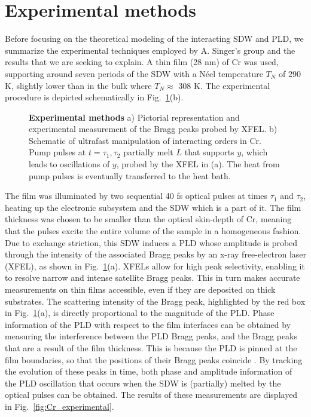 \section{Experimental methods}
Before focusing on the theoretical modeling of the interacting SDW and PLD, we summarize the experimental techniques employed by A. Singer's group and the results that we are seeking to explain.
A thin film (28 nm) of Cr was used, supporting around seven periods of the SDW with a N\'eel temperature $T_N$ of 290 K, slightly lower than in the bulk where $T_N\approx$ 308 K.
The experimental procedure is depicted schematically in Fig.~\ref{fig:Cr_schematic}(b). 
\begin{figure}[h]
\caption{\label{fig:Cr_schematic}{\bf Experimental methods} a) Pictorial representation and experimental measurement of the Bragg peaks probed by XFEL. b) Schematic of ultrafast manipulation of interacting orders in Cr. Pump pulses at $t=\tau_1,\tau_2$ partially melt $L$ that supports $y$, which leads to oscillations of $y$, probed by the XFEL in (a). The heat from pump pulses is eventually transferred to the heat bath.}
\end{figure}
The film was illuminated by two sequential 40 fs optical pulses at times $\tau_1$ and $\tau_2$, heating up the electronic subsystem and the SDW which is a part of it.
The film thickness was chosen to be smaller than the optical skin-depth of Cr, meaning that the pulses excite the entire volume of the sample in a homogeneous fashion.
Due to exchange striction, this SDW induces a PLD whose amplitude is probed through the intensity of the associated Bragg peaks by an x-ray free-electron laser (XFEL)\cite{Singer2015prb, Singer2015prl}, as shown in Fig.~\ref{fig:Cr_schematic}(a).
XFELs allow for high peak selectivity, enabling it to resolve narrow and intense satellite Bragg peaks.
This in turn makes accurate measurements on thin films accessible, even if they are deposited on thick substrates.
The scattering intensity of the Bragg peak, highlighted by the red box in Fig.~\ref{fig:Cr_schematic}(a), is directly proportional to the magnitude of the PLD.
Phase information of the PLD with respect to the film interfaces can be obtained by measuring the interference between the PLD Bragg peaks, and the Bragg peaks that are a result of the film thickness.
This is because the PLD is pinned at the film boundaries, so that the positions of their Bragg peaks coincide \cite{Singer2015prb}.
By tracking the evolution of these peaks in time, both phase and amplitude information of the PLD oscillation that occurs when the SDW is (partially) melted by the optical pulses can be obtained.
The results of these measurements are displayed in Fig.~\ref{fig:Cr_experimental}.

